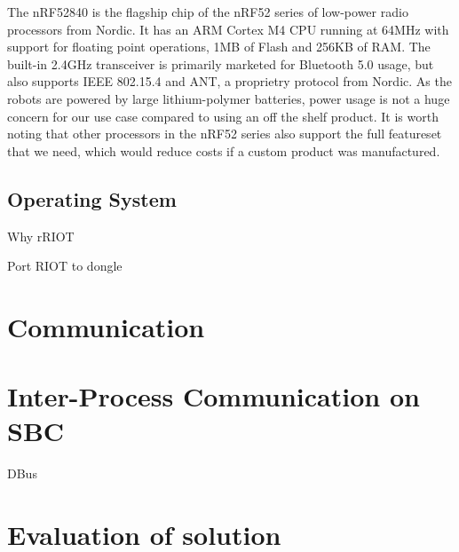 \documentclass[conference]{IEEEtran}
\begin{document}
The nRF52840 is the flagship chip of the nRF52 series of low-power radio processors from Nordic. It has an ARM Cortex M4 CPU running at 64MHz with support for floating point operations, 1MB of Flash and 256KB of RAM. The built-in 2.4GHz transceiver is primarily marketed for Bluetooth 5.0 usage, but also supports IEEE 802.15.4 and ANT, a proprietry protocol from Nordic. As the robots are powered by large lithium-polymer batteries, power usage is not a huge concern for our use case compared to using an off the shelf product. It is worth noting that other processors in the nRF52 series also support the full featureset that we need, which would reduce costs if a custom product was manufactured.

\subsection{Operating System}

Why rRIOT

Port RIOT to dongle

\section{Communication}

\section{Inter-Process Communication on SBC}

DBus

\section{Evaluation of solution}




\end{document}
